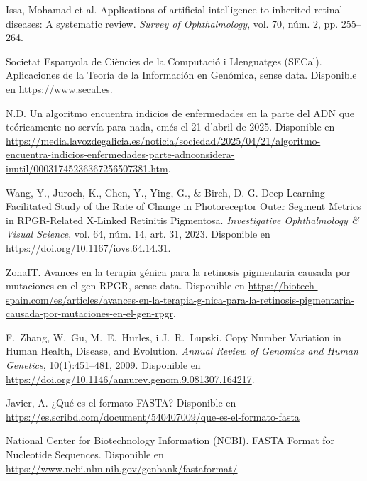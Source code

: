 \documentclass[11pt,spanish,listoffigures,listoftables]{tfgetsinf}
\begin{document}
\begin{thebibliography}{99}
   Issa, Mohamad et al.  
   \newblock Applications of artificial intelligence to inherited retinal diseases: A systematic review.  
   \newblock \textit{Survey of Ophthalmology}, vol. 70, núm. 2, pp. 255--264.  

   Societat Espanyola de Ciències de la Computació i Llenguatges (SECal).  
   \newblock Aplicaciones de la Teoría de la Información en Genómica,  
   sense data.  
   \newblock Disponible en  
   \url{https://www.secal.es}.

   N.D.  
   \newblock Un algoritmo encuentra indicios de enfermedades en la parte del ADN que teóricamente no servía para nada,  
   emés el 21 d’abril de 2025.  
   \newblock Disponible en  
   \url{https://media.lavozdegalicia.es/noticia/sociedad/2025/04/21/algoritmo-encuentra-indicios-enfermedades-parte-adnconsidera-inutil/00031745236367256507381.htm}.

   Wang, Y., Juroch, K., Chen, Y., Ying, G., \& Birch, D. G.  
   \newblock Deep Learning–Facilitated Study of the Rate of Change in Photoreceptor Outer Segment Metrics in RPGR-Related X-Linked Retinitis Pigmentosa.  
   \newblock \textit{Investigative Ophthalmology \& Visual Science}, vol. 64, núm. 14, art. 31, 2023.  
   \newblock Disponible en  
   \url{https://doi.org/10.1167/iovs.64.14.31}.

   ZonaIT.  
   \newblock Avances en la terapia génica para la retinosis pigmentaria causada por mutaciones en el gen RPGR,  
   sense data.  
   \newblock Disponible en  
   \url{https://biotech-spain.com/es/articles/avances-en-la-terapia-g-nica-para-la-retinosis-pigmentaria-causada-por-mutaciones-en-el-gen-rpgr}.

   F.~Zhang, W.~Gu, M.~E.~Hurles, i J.~R.~Lupski.
   \newblock Copy Number Variation in Human Health, Disease, and Evolution.
   \newblock \textit{Annual Review of Genomics and Human Genetics}, 10(1):451--481, 2009.
   \newblock Disponible en
   \newblock \url{https://doi.org/10.1146/annurev.genom.9.081307.164217}.
   
   Javier, A.  
   \newblock ¿Qué es el formato FASTA?    
   \newblock Disponible en 
   \newblock \url{https://es.scribd.com/document/540407009/que-es-el-formato-fasta}
 
   National Center for Biotechnology Information (NCBI).  
   \newblock FASTA Format for Nucleotide Sequences. 
   \newblock Disponible en 
   \newblock \url{https://www.ncbi.nlm.nih.gov/genbank/fastaformat/}
 

\end{thebibliography}
\end{document}
